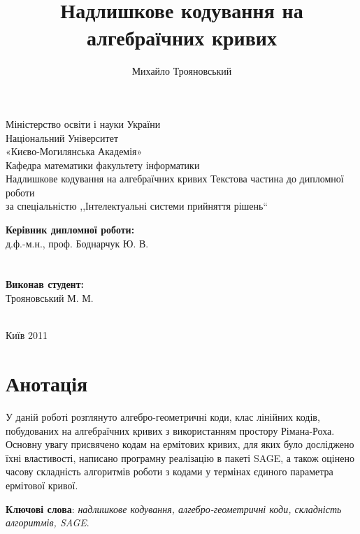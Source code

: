 \documentclass[a4paper,14pt,oneside]{extarticle}
\title{Надлишкове кодування на алгебраїчних кривих}
\author{Михайло Трояновський}
\begin{document}
\begin{titlepage}
\begin{center}
    Міністерство освіти і науки України\\
Національний Університет\\ «Києво-Могилянська Академія»\\
        Кафедра математики факультету інформатики\\
        \vskip 5cm
{\Large
        Надлишкове кодування на алгебраїчних кривих
}
\vskip 2cm
{\large
Текстова частина до дипломної роботи \\
за спеціальністю ,,Інтелектуальні системи прийняття рішень``
}
\vskip 2cm
\textwidth
\begin{minipage}{0.5\textwidth}
        \textbf{Керівник дипломної роботи:}\\
        д.ф.-м.н., проф. Боднарчук Ю. В.\\
        \\
        \\
\textbf{Виконав студент:}\\
        Трояновський М. М.\\
        \\
        \end{minipage}
        \vfill
        Київ 2011
        \end{center}
        \end{titlepage}


\tableofcontents
\pagebreak
\section*{Анотація}
У даній роботі розглянуто алгебро-геометричні коди, клас лінійних кодів, побудованих на алгебраїчних кривих з використанням простору Рімана-Роха. 
Основну увагу присвячено кодам на ермітових кривих, для яких було досліджено їхні властивості, написано програмну реалізацію в пакеті SAGE, а 
також оцінено часову складність алгоритмів роботи з кодами у термінах єдиного параметра ермітової кривої.

\textbf{Ключові слова}: \textit{надлишкове кодування, алгебро-геометричні коди, складність алгоритмів, SAGE}.

\pagebreak
\end{document}
